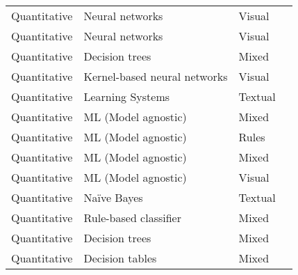\documentclass[final,1p,times]{elsarticle}
\begin{document}
\begin{table}[htbp]
\begin{tabular}{m{1.8cm} m{5cm} m{2cm} m{3cm}}
    Quantitative & Neural networks & Visual & \cite{stock2018convnets} \\
    Quantitative & Neural networks & Visual & \cite{bau2017network} \\
    Quantitative & Decision trees & Mixed & \cite{luvstrek2014comprehensibility}\\
    Quantitative & Kernel-based neural networks & Visual & \cite{hansen2011visual} \\
    Quantitative & Learning Systems & Textual &  \cite{aleven2002effective,harbers2010guidelines, harbers2010design}\\
    Quantitative & ML (Model agnostic) & Mixed & \cite{lage2018human}\\
    Quantitative & ML (Model agnostic) & Rules & \cite{ribeiro2018anchors}\\
    Quantitative & ML (Model agnostic) & Mixed &  \cite{poursabzi2018manipulating}\\
    Quantitative & ML (Model agnostic) & Visual & \cite{spinner2019explainer}\\
    Quantitative & Na\"{i}ve Bayes & Textual & \cite{kulesza2011oriented, kulesza2015principles}\\
    Quantitative & Rule-based classifier & Mixed & \cite{allahyari2011user, huysmans2011empirical}\\
    Quantitative & Decision trees & Mixed & \cite{allahyari2011user, huysmans2011empirical}\\
    Quantitative & Decision tables & Mixed & \cite{huysmans2011empirical}\\
  \hline
\end{tabular}
\end{table}
\end{document}
